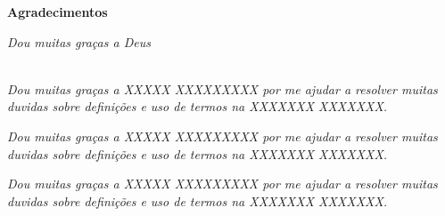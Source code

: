 \cleardoublepage

\begin{center}
\Huge{\textbf{Agradecimentos}}
\end{center}

\null
\vfill
\thispagestyle{empty}

{\normalsize \it \hfill Dou muitas graças a Deus \vspace*{4pt}}


~\\

{\normalsize \it Dou muitas graças a XXXXX XXXXXXXXX por me 
ajudar a resolver muitas duvidas sobre definições e uso de termos na XXXXXXX XXXXXXX.
\vspace*{4pt}}

{\normalsize \it Dou muitas graças a XXXXX XXXXXXXXX por me 
ajudar a resolver muitas duvidas sobre definições e uso de termos na XXXXXXX XXXXXXX.
\vspace*{4pt}}

{\normalsize \it Dou muitas graças a XXXXX XXXXXXXXX por me 
ajudar a resolver muitas duvidas sobre definições e uso de termos na XXXXXXX XXXXXXX.
\vspace*{4pt}}


\begin{comment}
{\normalsize \it Dou muitas graças a \textcolor{red}{XXXXXXXXXXX} pela 
suas sugestões e revisão  do capitulo \textcolor{red}{XXXXXXXXXXX}.
\vspace*{4pt}}
\end{comment}


